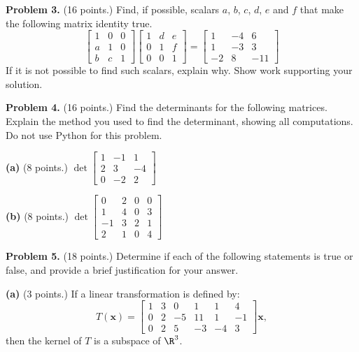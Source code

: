 \documentclass[12pt]{article}
\begin{document}
\clearpage

\textbf{Problem 3.} (16 points.) Find, if possible, scalars $a$, $b$, $c$, $d$, $e$ and $f$ that make the following matrix identity true.
\[
\left[\begin{matrix}1 & 0 & 0\\a & 1 & 0\\b & c & 1\end{matrix}\right]
\left[\begin{matrix}1 & d & e\\0 & 1 & f\\0 & 0 & 1\end{matrix}\right]=
\left[\begin{matrix}1 & -4 & 6\\1 & -3 & 3\\-2 & 8 & -11\end{matrix}\right]
\]
If it is not possible to find such scalars, explain why. Show work supporting your solution. 

\clearpage

\textbf{Problem 4.} (16 points.) Find the determinants for the following matrices. Explain the method you used to find the determinant, showing all computations. Do not use Python for this problem.

\textbf{(a)} (8 points.)
$
\det\left[\begin{matrix}1 & -1 & 1\\2 & 3 & -4\\0 & -2 & 2\end{matrix}\right]
$

\vskip4in

\textbf{(b)} (8 points.)
$
\det\left[\begin{matrix}0 & 2 & 0 & 0\\1 & 4 & 0 & 3\\-1 & 3 & 2 & 1\\2 & 1 & 0 & 4\end{matrix}\right] 
$
\clearpage

\textbf{Problem 5.} (18 points.) Determine if each of the following statements is true or false, and provide a brief justification for your answer.

\textbf{(a)} (3 points.) If a linear transformation is defined by:
\[
T(\mathbf{x})=
\begin{bmatrix}
1&3&0&1&1&4\\0&2&-5&11&1&-1\\0&2&5&-3&-4&3
\end{bmatrix}\mathbf{x},
\]
then the kernel of $T$ is a subspace of $\R^3$.
\end{document}
